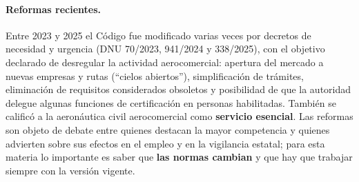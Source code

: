 \paragraph*{Reformas recientes.}
Entre 2023 y 2025 el Código fue modificado varias veces por decretos de necesidad y urgencia
(DNU 70/2023, 941/2024 y 338/2025), con el objetivo declarado de desregular la actividad
aerocomercial: apertura del mercado a nuevas empresas y rutas (``cielos abiertos''),
simplificación de trámites, eliminación de requisitos considerados obsoletos y posibilidad de
que la autoridad delegue algunas funciones de certificación en personas habilitadas. También se
calificó a la aeronáutica civil aerocomercial como \textbf{servicio esencial}. Las reformas son
objeto de debate entre quienes destacan la mayor competencia y quienes advierten sobre sus
efectos en el empleo y en la vigilancia estatal; para esta materia lo importante es saber que
\textbf{las normas cambian} y que hay que trabajar siempre con la versión vigente.

